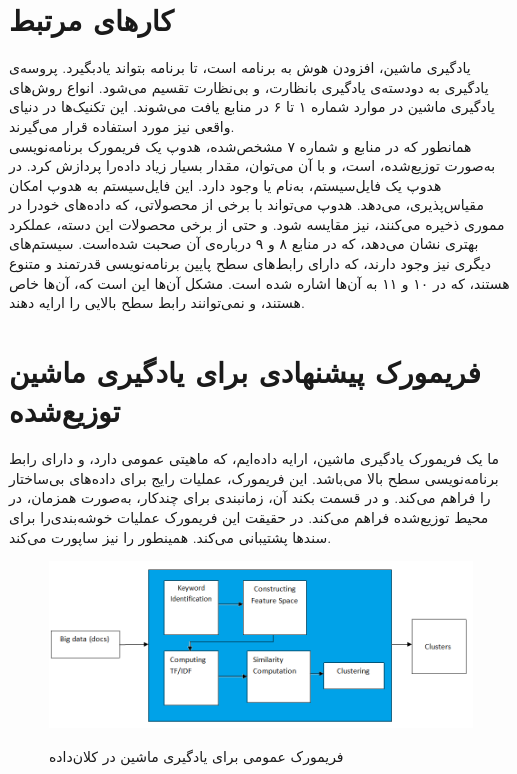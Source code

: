 \documentclass[12pt,onecolumn,a4paper]{article}
\begin{document}
\section{کارهای مرتبط}
یادگیری ماشین، افزودن هوش به برنامه است، تا برنامه بتواند یادبگیرد. پروسه‌ی یادگیری به دودسته‌ی یادگیری بانظارت، و بی‌نظارت تقسیم می‌شود. انواع روش‌های یادگیری ماشین در موارد شماره ۱ تا ۶ در منابع یافت می‌شوند.
این تکنیک‌ها در دنیای واقعی نیز مورد استفاده قرار می‌گیرند. \\
همانطور که در منابع و شماره ۷ مشخص‌شده، هدوپ یک فریمورک برنامه‌نویسی به‌صورت توزیع‌شده، است، و با آن می‌توان، مقدار بسیار زیاد داده‌را پردازش کرد.
در هدوپ یک فایل‌سیستم، به‌نام  یا  وجود دارد. این فایل‌سیستم به هدوپ امکان مقیاس‌پذیری، می‌دهد. هدوپ می‌تواند با برخی از محصولاتی، که داده‌های خودرا در مموری ذخیره می‌کنند، نیز مقایسه شود.
و حتی از برخی محصولات این دسته، عملکرد بهتری نشان می‌دهد، که در منابع ۸ و ۹ درباره‌ی آن صحبت شده‌است.
سیستم‌های دیگری نیز وجود دارند، که دارای رابط‌های سطح پایین برنامه‌نویسی قدرتمند و متنوع هستند، که در ۱۰ و ۱۱ به آن‌ها اشاره شده است.
مشکل آن‌ها این است که، آن‌ها خاص هستند، و نمی‌توانند رابط سطح بالایی را ارایه دهند.

\section{ فریمورک پیشنهادی برای یادگیری ماشین توزیع‌شده}
ما یک فریمورک یادگیری ماشین، ارایه داده‌ایم، که ماهیتی عمومی دارد، و دارای رابط برنامه‌نویسی سطح بالا می‌باشد. این فریمورک، عملیات رایج برای داده‌های بی‌ساختار را فراهم می‌کند. و در قسمت بکند آن، زمانبندی برای چندکار، به‌صورت همزمان، در محیط توزیع‌شده فراهم می‌کند.
در حقیقت این فریمورک عملیات خوشه‌بندی‌را برای سندها پشتیبانی می‌کند. همینطور  را نیز ساپورت می‌کند.

\begin{figure}[h!]
    \centering
    \includegraphics[width=1.2\textwidth]{clustering.png}
    \label{fig:clustering}
    \caption{فریمورک عمومی برای یادگیری ماشین در کلان‌داده}
\end{figure}
\end{document}
